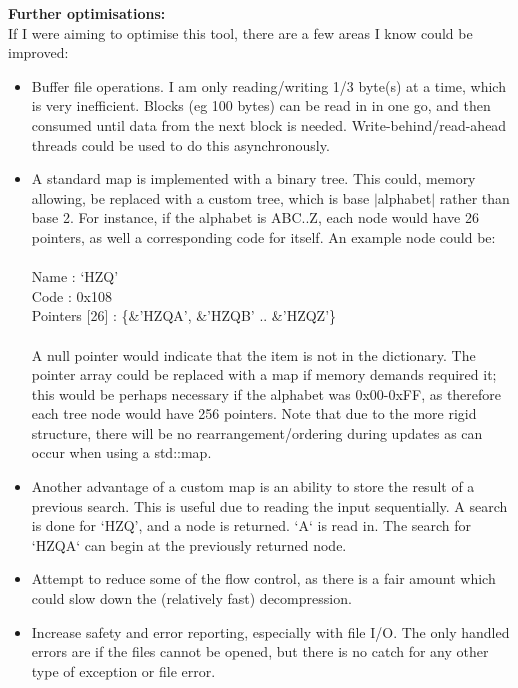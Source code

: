 \documentclass{article}
\begin{document}
\vspace{\baselineskip} \noindent
\textbf{Further optimisations:} \\
If I were aiming to optimise this tool, there are a few areas I know could be improved:
\begin{itemize}
    \item Buffer file operations. I am only reading/writing 1/3 byte(s) at a time, which is very inefficient. Blocks (eg 100 bytes) can be read in in one go, and then consumed until data from the next block is needed. Write-behind/read-ahead threads could be used to do this asynchronously.
    \item A standard map is implemented with a binary tree. This could, memory allowing, be replaced with a custom tree, which is base $|$alphabet$|$ rather than base 2. For instance, if the alphabet is ABC..Z, each node would have 26 pointers, as well a corresponding code for itself. An example node could be: \\ \\
        Name : `HZQ' \\
        Code : 0x108 \\
        Pointers [26] : \{\&'HZQA', \&'HZQB' .. \&'HZQZ'\} \\ \\
    A null pointer would indicate that the item is not in the dictionary. The pointer array could be replaced with a map if memory demands required it; this would be perhaps necessary if the alphabet was 0x00-0xFF, as therefore each tree node would have 256 pointers. Note that due to the more rigid structure, there will be no rearrangement/ordering during updates as can occur when using a std::map.
    \item Another advantage of a custom map is an ability to store the result of a previous search. This is useful due to reading the input sequentially. A search is done for `HZQ', and a node is returned. `A` is read in. The search for `HZQA` can begin at the previously returned node.
    \item Attempt to reduce some of the flow control, as there is a fair amount which could slow down the (relatively fast) decompression.
    \item Increase safety and error reporting, especially with file I/O. The only handled errors are if the files cannot be opened, but there is no catch for any other type of exception or file error.

\end{itemize}
\end{document}
